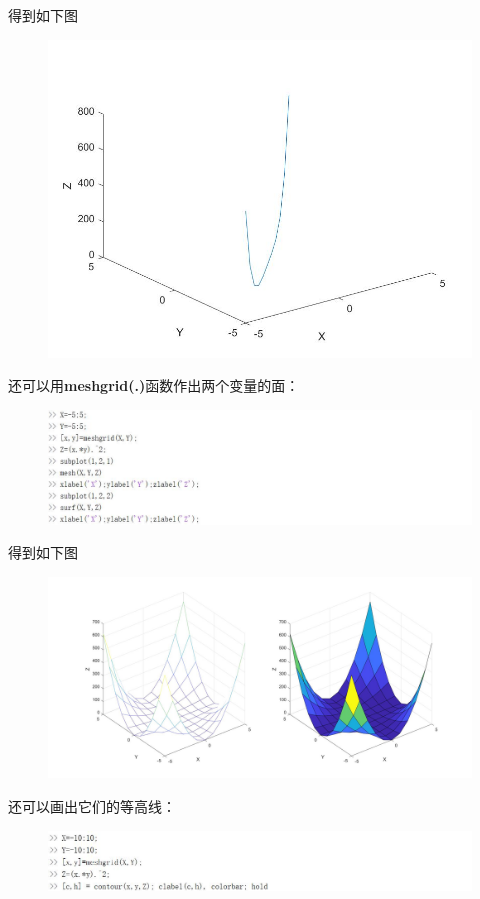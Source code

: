 \documentclass[cn,10pt,math=newtx,citestyle=gb7714-2015,bibstyle=gb7714-2015]{elegantbook}
\begin{document}
{{	得到如下图
	\begin{figure}[htbp!]
		\centering
		\includegraphics[width=0.8\linewidth]{FIG/3Dplot.jpg}
		\centering
	\end{figure}
	
	还可以用\textbf{meshgrid(.)}函数作出两个变量的面：
	\begin{figure}[htbp!]
		\centering
		\includegraphics[width=0.8\linewidth]{FIG/surf.jpg}
		\centering
	\end{figure}
	
	得到如下图
	\begin{figure}[htbp!]
		\centering
		\includegraphics[width=0.8\linewidth]{FIG/surf1.jpg}
		\centering
	\end{figure}
	
	还可以画出它们的等高线：
	
	\begin{figure}[htbp!]
		\centering
		\includegraphics[width=0.8\linewidth]{FIG/contours}
		\centering
	\end{figure}
	
}}
\end{document}
